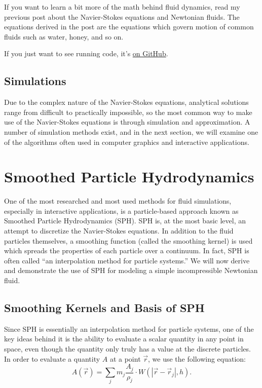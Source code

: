 \documentclass[a4paper]{article}
\begin{document}
If you want to learn a bit more of the math behind fluid dynamics, read my previous post about the
Navier-Stokes equations and Newtonian fluids. The equations derived in the post are the equations
which govern motion of common fluids such as water, honey, and so on.

If you just want to see running code, it's \href{https://github.com/gibiansky/experiments/tree/master/fluids}{on GitHub}.

\subsection*{Simulations}
Due to the complex nature of the Navier-Stokes equations, analytical solutions range from difficult to practically impossible, so the most common way to make use of the Navier-Stokes equations is through simulation and approximation. A number of simulation methods exist, and in the next section, we will examine one of the algorithms often used in computer graphics and interactive applications.

\section*{Smoothed Particle Hydrodynamics}
One of the most researched and most used methods for fluid simulations, especially in interactive applications, is a particle-based approach known as Smoothed Particle Hydrodynamics (SPH). SPH is, at the most basic level, an attempt to discretize the Navier-Stokes equations. In addition to the fluid particles themselves, a smoothing function (called the smoothing kernel) is used which spreads the properties of each particle over a continuum. In fact, SPH is often called ``an interpolation method for particle systems.'' We will now derive and demonstrate the use of SPH for modeling a simple incompressible Newtonian fluid.

\subsection*{Smoothing Kernels and Basis of SPH}
Since SPH is essentially an interpolation method for particle systems, one of the key ideas behind it is the ability to evaluate a scalar quantity in any point in space, even though the quantity only truly has a value at the discrete particles. \\

In order to evaluate a quantity $A$ at a point $\vec r$, we use the following equation:
\[A(\vec r) = \sum_j m_j\frac{A_j}{\rho_j}\cdot W(|\vec r - \vec r_j|, h).\]
\end{document}
